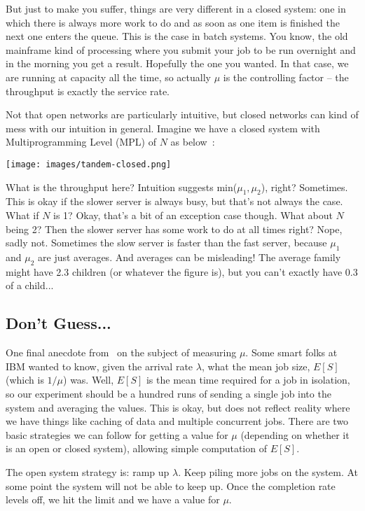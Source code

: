 But just to make you suffer, things are very different in a closed system: one in which there is always more work to do and as soon as one item is finished the next one enters the queue. This is the case in batch systems. You know, the old mainframe kind of processing where you submit your job to be run overnight and in the morning you get a result. Hopefully the one you wanted. In that case, we are running at capacity all the time, so actually $\mu$ is the controlling factor -- the throughput is exactly the service rate. 

Not that open networks are particularly intuitive, but closed networks can kind of mess with our intuition in general. Imagine we have a closed system with Multiprogramming Level (MPL) of $N$ as below~\cite{pmd}:

\begin{center}
	\texttt{[image: images/tandem-closed.png]}
\end{center}

What is the throughput here? Intuition suggests min($\mu_{1}, \mu_{2}$), right? Sometimes. This is okay if the slower server is always busy, but that's not always the case. What if $N$ is 1? Okay, that's a bit of an exception case though. What about $N$ being 2? Then the slower server has some work to do at all times right? Nope, sadly not. Sometimes the slow server is faster than the fast server, because $\mu_{1}$ and $\mu_{2}$ are just averages. And averages can be misleading! The average family might have 2.3 children (or whatever the figure is), but you can't exactly have 0.3 of a child...

\subsection*{Don't Guess...}
One final anecdote from~\cite{pmd} on the subject of measuring $\mu$. Some smart folks at IBM wanted to know, given the arrival rate $\lambda$, what the mean job size, $E[S]$ (which is $1/\mu$) was. Well, $E[S]$ is the mean time required for a job in isolation, so our experiment should be a hundred runs of sending a single job into the system and averaging the values. This is okay, but does not reflect reality where we have things like caching of data and multiple concurrent jobs. There are two basic strategies we can follow for getting a value for $\mu$ (depending on whether it is an open or closed system), allowing simple computation of $E[S]$.

The open system strategy is: ramp up $\lambda$. Keep piling more jobs on the system. At some point the system will not be able to keep up. Once the completion rate levels off, we hit the limit and we have a value for $\mu$.

